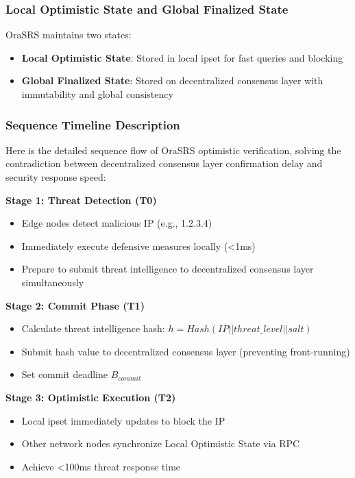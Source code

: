 \documentclass[12pt]{article}
\begin{document}
\subsubsection{Local Optimistic State and Global Finalized State}
OraSRS maintains two states:
\begin{itemize}
\item \textbf{Local Optimistic State}: Stored in local ipset for fast queries and blocking
\item \textbf{Global Finalized State}: Stored on decentralized consensus layer with immutability and global consistency
\end{itemize}

\subsubsection{Sequence Timeline Description}
Here is the detailed sequence flow of OraSRS optimistic verification, solving the contradiction between decentralized consensus layer confirmation delay and security response speed:

\textbf{Stage 1: Threat Detection (T0)}
\begin{itemize}
\item Edge nodes detect malicious IP (e.g., 1.2.3.4)
\item Immediately execute defensive measures locally (<1ms)
\item Prepare to submit threat intelligence to decentralized consensus layer simultaneously
\end{itemize}

\textbf{Stage 2: Commit Phase (T1)}
\begin{itemize}
\item Calculate threat intelligence hash: $h = Hash(IP || threat\_level || salt)$
\item Submit hash value to decentralized consensus layer (preventing front-running)
\item Set commit deadline $B_{commit}$
\end{itemize}

\textbf{Stage 3: Optimistic Execution (T2)}
\begin{itemize}
\item Local ipset immediately updates to block the IP
\item Other network nodes synchronize Local Optimistic State via RPC
\item Achieve <100ms threat response time
\end{itemize}
\end{document}
